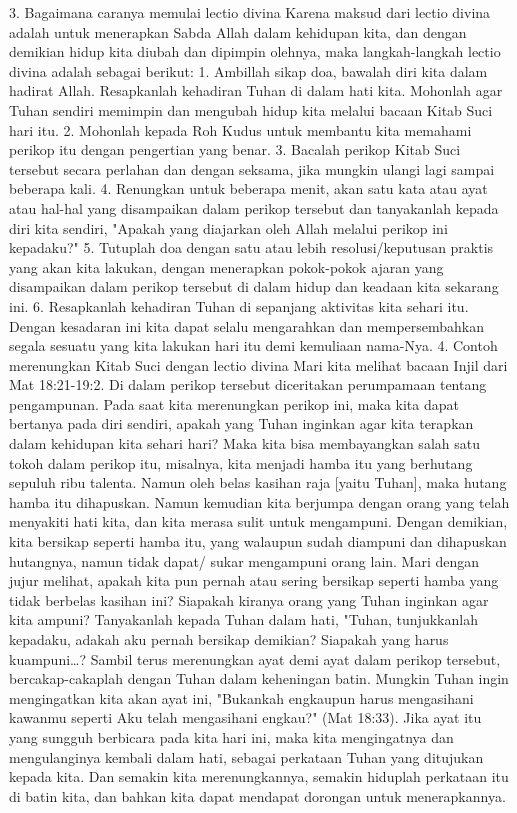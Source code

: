 3. Bagaimana caranya memulai lectio divina
Karena maksud dari lectio divina adalah untuk menerapkan Sabda Allah dalam kehidupan kita, dan dengan demikian hidup kita diubah dan dipimpin olehnya, maka langkah-langkah lectio divina adalah sebagai berikut:
1.    Ambillah sikap doa, bawalah diri kita dalam hadirat Allah. Resapkanlah kehadiran Tuhan di dalam hati kita. Mohonlah agar Tuhan sendiri memimpin dan mengubah hidup kita melalui bacaan Kitab Suci hari itu.
2.    Mohonlah kepada Roh Kudus untuk membantu kita memahami perikop itu dengan pengertian yang benar.
3.    Bacalah perikop Kitab Suci tersebut secara perlahan dan dengan seksama, jika mungkin ulangi lagi sampai beberapa kali.
4.    Renungkan untuk beberapa menit, akan satu kata atau ayat atau hal-hal yang disampaikan dalam perikop tersebut dan tanyakanlah kepada diri kita sendiri, "Apakah yang diajarkan oleh Allah melalui perikop ini kepadaku?"
5.    Tutuplah doa dengan satu atau lebih resolusi/keputusan praktis yang akan kita lakukan, dengan menerapkan pokok-pokok ajaran yang disampaikan dalam perikop tersebut di dalam hidup dan keadaan kita sekarang ini.
6.    Resapkanlah kehadiran Tuhan di sepanjang aktivitas kita sehari itu. Dengan kesadaran ini kita dapat selalu mengarahkan dan mempersembahkan segala sesuatu yang kita lakukan hari itu demi kemuliaan nama-Nya.
4. Contoh merenungkan Kitab Suci dengan lectio divina
Mari kita melihat bacaan Injil dari Mat 18:21-19:2. Di dalam perikop tersebut diceritakan perumpamaan tentang pengampunan. Pada saat kita merenungkan perikop ini, maka kita dapat bertanya pada diri sendiri, apakah yang Tuhan inginkan agar kita terapkan dalam kehidupan kita sehari hari?
Maka kita bisa membayangkan salah satu tokoh dalam perikop itu, misalnya, kita menjadi hamba itu yang berhutang sepuluh ribu talenta. Namun oleh belas kasihan raja [yaitu Tuhan], maka hutang hamba itu dihapuskan. Namun kemudian kita berjumpa dengan orang yang telah menyakiti hati kita, dan kita merasa sulit untuk mengampuni. Dengan demikian, kita bersikap seperti hamba itu, yang walaupun sudah diampuni dan dihapuskan hutangnya, namun tidak dapat/ sukar mengampuni orang lain. Mari dengan jujur melihat, apakah kita pun pernah atau sering bersikap seperti hamba yang tidak berbelas kasihan ini?  Siapakah kiranya orang yang Tuhan inginkan agar kita ampuni? Tanyakanlah kepada Tuhan dalam hati, "Tuhan, tunjukkanlah kepadaku, adakah aku pernah bersikap demikian? Siapakah yang harus kuampuni…?
Sambil terus merenungkan ayat demi ayat dalam perikop tersebut, bercakap-cakaplah dengan Tuhan dalam keheningan batin. Mungkin Tuhan ingin mengingatkan kita akan ayat ini, "Bukankah engkaupun harus mengasihani kawanmu seperti Aku telah mengasihani engkau?" (Mat 18:33). Jika ayat itu yang sungguh berbicara pada kita hari ini, maka kita mengingatnya dan mengulanginya kembali dalam hati, sebagai perkataan Tuhan yang ditujukan kepada kita. Dan semakin kita merenungkannya, semakin hiduplah perkataan itu di batin kita, dan bahkan kita dapat mendapat dorongan untuk menerapkannya.
